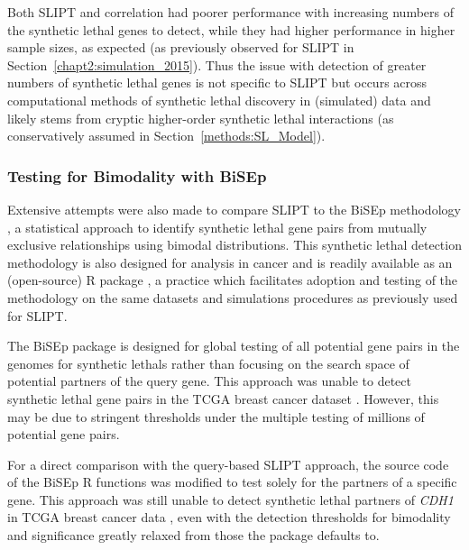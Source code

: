 Both \gls{SLIPT} and correlation had poorer performance with increasing numbers of the \gls{synthetic lethal} genes to detect, while they had higher performance in higher sample sizes, as expected (as previously observed for \gls{SLIPT} in Section~\ref{chapt2:simulation_2015}). Thus the issue with detection of greater numbers of \gls{synthetic lethal} genes is not specific to \gls{SLIPT} but occurs across computational methods of \gls{synthetic lethal} discovery in (simulated)  data and likely stems from cryptic higher-order \gls{synthetic lethal} interactions (as conservatively assumed in Section~\ref{methods:SL_Model}). 
    

\subsubsection{Testing for Bimodality with BiSEp}
\label{chapt5:compare_bisep}

Extensive attempts were also made to compare \gls{SLIPT} to the \gls{BiSEp} methodology \citep{Wappett2016}, a statistical approach to identify \gls{synthetic lethal} gene pairs from mutually exclusive relationships using bimodal distributions. This \gls{synthetic lethal} detection methodology is also designed for  analysis in cancer and is readily available as an (open-source) R package \citep{Wappett2014}, a practice which facilitates adoption and testing of the methodology on the same datasets and simulations procedures as previously used for \gls{SLIPT}.

The \gls{BiSEp} package is designed for global testing of all potential gene pairs in the \glspl{genome} for \glspl{synthetic lethal} rather than focusing on the search space of  potential partners of the query gene. This approach was unable to detect \gls{synthetic lethal} gene pairs in the \gls{TCGA} breast cancer  dataset \citep{TCGA2012}. However, this may be due to stringent thresholds under the multiple testing of millions of potential gene pairs.

For a direct comparison with the query-based \gls{SLIPT} approach, the source code of the \gls{BiSEp} R functions was modified to test solely for the partners of a specific gene. This approach was still unable to detect \gls{synthetic lethal} partners of \textit{CDH1} in \gls{TCGA} breast cancer  data \citep{TCGA2012}, even with the detection thresholds for bimodality and significance greatly relaxed from those the package defaults to.

